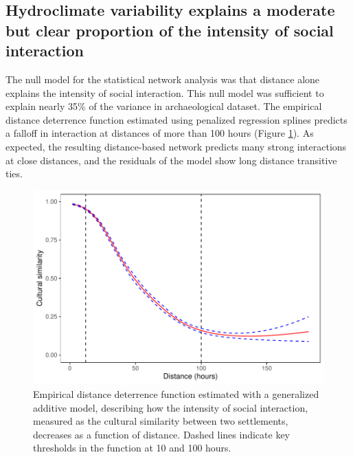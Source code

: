\documentclass[10pt]{iopart}
\begin{document}
\subsection*{Hydroclimate variability explains a moderate but clear proportion of the intensity of social interaction}
The null model for the statistical network analysis was that distance alone explains the intensity of social interaction. This null model was sufficient to explain nearly 35\% of the variance in archaeological dataset. The empirical distance deterrence function estimated using penalized regression splines predicts a falloff in interaction at distances of more than 100 hours (Figure \ref{fig:distance}). As expected, the resulting distance-based network predicts many strong interactions at close distances, and the residuals of the model show long distance transitive ties.

\begin{figure}[!htbp]
\centering
\includegraphics[width=\linewidth]{figures/distance_function.pdf}
\caption{Empirical distance deterrence function estimated with a generalized additive model, describing how the intensity of social interaction, measured as the cultural similarity between two settlements, decreases as a function of distance. Dashed lines indicate key thresholds in the function at 10 and 100 hours.}
\label{fig:distance}
\end{figure}
\end{document}

